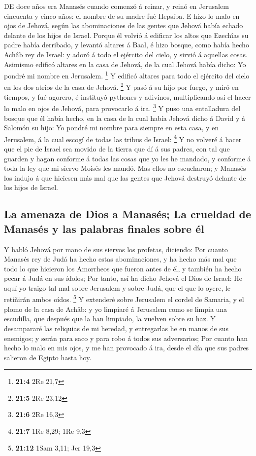  DE doce años era Manasés cuando comenzó á reinar, y reinó
en Jerusalem cincuenta y cinco años: el nombre de su madre fué Hepsiba.
 E hizo lo malo en ojos de Jehová, según las abominaciones
de las gentes que Jehová había echado delante de los hijos de Israel.
 Porque él volvió á edificar los altos que Ezechîas su padre
había derribado, y levantó altares á Baal, é hizo bosque, como había
hecho Achâb rey de Israel: y adoró á todo el ejército del cielo, y
sirvió á aquellas cosas.  Asimismo edificó altares en la
casa de Jehová, de la cual Jehová había dicho: Yo pondré mi nombre en
Jerusalem. \footnote{\textbf{21:4} 2Re 21,7}  Y edificó
altares para todo el ejército del cielo en los dos atrios de la casa de
Jehová. \footnote{\textbf{21:5} 2Re 23,12}  Y pasó á su hijo
por fuego, y miró en tiempos, y fué agorero, é instituyó pythones y
adivinos, multiplicando así el hacer lo malo en ojos de Jehová, para
provocarlo á ira. \footnote{\textbf{21:6} 2Re 16,3}  Y puso
una entalladura del bosque que él había hecho, en la casa de la cual
había Jehová dicho á David y á Salomón su hijo: Yo pondré mi nombre para
siempre en esta casa, y en Jerusalem, á la cual escogí de todas las
tribus de Israel: \footnote{\textbf{21:7} 1Re 8,29; 1Re 9,3}
 Y no volveré á hacer que el pie de Israel sea movido de la
tierra que dí á sus padres, con tal que guarden y hagan conforme á todas
las cosas que yo les he mandado, y conforme á toda la ley que mi siervo
Moisés les mandó.  Mas ellos no escucharon; y Manasés los
indujo á que hiciesen más mal que las gentes que Jehová destruyó delante
de los hijos de Israel.

\hypertarget{la-amenaza-de-dios-a-manasuxe9s-la-crueldad-de-manasuxe9s-y-las-palabras-finales-sobre-uxe9l}{%
\subsection{La amenaza de Dios a Manasés; La crueldad de Manasés y las
palabras finales sobre
él}\label{la-amenaza-de-dios-a-manasuxe9s-la-crueldad-de-manasuxe9s-y-las-palabras-finales-sobre-uxe9l}}

 Y habló Jehová por mano de sus siervos los profetas,
diciendo:  Por cuanto Manasés rey de Judá ha hecho estas
abominaciones, y ha hecho más mal que todo lo que hicieron los Amorrheos
que fueron antes de él, y también ha hecho pecar á Judá en sus ídolos;
 Por tanto, así ha dicho Jehová el Dios de Israel: He aquí
yo traigo tal mal sobre Jerusalem y sobre Judá, que el que lo oyere, le
retiñirán ambos oídos. \footnote{\textbf{21:12} 1Sam 3,11; Jer 19,3}
 Y extenderé sobre Jerusalem el cordel de Samaria, y el
plomo de la casa de Achâb: y yo limpiaré á Jerusalem como se limpia una
escudilla, que después que la han limpiado, la vuelven sobre su haz.
 Y desampararé las reliquias de mi heredad, y entregarlas
he en manos de sus enemigos; y serán para saco y para robo á todos sus
adversarios;  Por cuanto han hecho lo malo en mis ojos, y
me han provocado á ira, desde el día que sus padres salieron de Egipto
hasta hoy.


